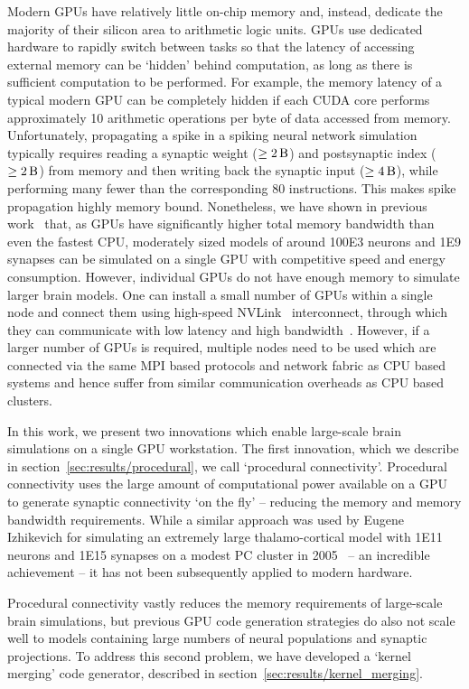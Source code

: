 \documentclass[9pt,a4paper]{amsart}
\begin{document}
Modern GPUs have relatively little on-chip memory and, instead, dedicate the majority of their silicon area to arithmetic logic units.
GPUs use dedicated hardware to rapidly switch between tasks so that the latency of accessing external memory can be `hidden' behind computation, as long as there is sufficient computation to be performed.
For example, the memory latency of a typical modern GPU can be completely hidden if each CUDA core performs approximately 10 arithmetic operations per byte of data accessed from memory.
Unfortunately, propagating a spike in a spiking neural network simulation typically requires reading a synaptic weight ($\ge \SI{2}{\byte}$) and postsynaptic index ($\ge \SI{2}{\byte}$) from memory and then writing back the synaptic input ($\ge \SI{4}{\byte}$), while performing many fewer than the corresponding 80 instructions. 
This makes spike propagation highly memory bound.
Nonetheless, we have shown in previous work~\citep{Knight2018} that, as GPUs have significantly higher total memory bandwidth than even the fastest CPU, moderately sized models of around \num{100E3} neurons and \num{1E9} synapses can be simulated on a single GPU with competitive speed and energy consumption.
However, individual GPUs do not have enough memory to simulate larger brain models.
One can install a small number of GPUs within a single node and connect them using high-speed NVLink~\citep{NVIDIACorporation} interconnect, through which they can communicate with low latency and high bandwidth~\citep{Li2020}.
However, if a larger number of GPUs is required, multiple nodes need to be used which are connected via the same MPI based protocols and network fabric as CPU based systems and hence suffer from similar communication overheads as CPU based clusters.

In this work, we present two innovations which enable large-scale brain simulations on a single GPU workstation.
The first innovation, which we describe in section~\ref{sec:results/procedural}, we call `procedural connectivity'.
Procedural connectivity uses the large amount of computational power available on a GPU to generate synaptic connectivity `on the fly' -- reducing the memory and memory bandwidth requirements.
While a similar approach was used by Eugene Izhikevich for simulating an extremely large thalamo-cortical model with \num{1E11} neurons and \num{1E15} synapses on a modest PC cluster in 2005~\citep{Izhikevich2005} -- an incredible achievement -- it has not been subsequently applied to modern hardware.

Procedural connectivity vastly reduces the memory requirements of large-scale brain simulations, but previous GPU code generation strategies do also not scale well to models containing large numbers of neural populations and synaptic projections.
To address this second problem, we have developed a `kernel merging' code generator, described in section~\ref{sec:results/kernel_merging}.
\end{document}
